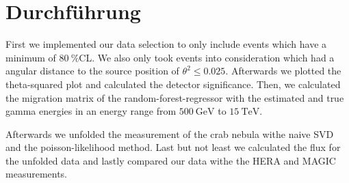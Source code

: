 \section{Durchführung}
\label{sec:durch}
First we implemented our data selection to only include events which have a minimum of $\SI{80}{\percent}$CL.
We also only took events into consideration which had a angular distance to the source position of $\theta^2 \leq \num{0.025}$.
Afterwards we plotted the theta-squared plot and calculated the detector significance.
Then, we calculated the migration matrix of the random-forest-regressor with the estimated and true gamma energies in an energy range from $\SI{500}{\giga\electronvolt}$ to $\SI{15}{\tera\electronvolt}$.

Afterwards we unfolded the measurement of the crab nebula withe naive SVD and the poisson-likelihood method.
Last but not least we calculated the flux for the unfolded data and lastly compared our data withe the HERA and MAGIC measurements.
